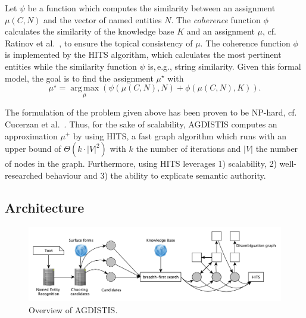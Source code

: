 Let $\psi$ be a function which computes the similarity between an assignment $\mu(C,N)$ and the vector of named entities $N$.
The \emph{coherence} function $\phi$ calculates the similarity of the knowledge base $K$ and an assignment $\mu$, cf. Ratinov et al.~\cite{rat:rot}, to ensure the topical consistency of $\mu$.
The coherence function $\phi$ is implemented by the  \ac{HITS} algorithm, which calculates the most pertinent entities while the similarity function $\psi$ is,\,e.g., string similarity.
Given this formal model, the goal is to find the assignment $\mu^\star$ with
\begin{equation*}
\mu^\star= \operatorname*{arg\,max}\limits_{\mu}\left(\psi(\mu(C,N), N) + \phi(\mu(C,N),K)\right).
\end{equation*}

The formulation of the problem given above has been proven to be NP-hard, cf. Cucerzan et al.~\cite{Cucerzan07}.
Thus, for the sake of scalability, AGDISTIS computes an approximation $\mu^{+}$ by using  \ac{HITS}, a fast graph algorithm which runs with an upper bound of $\Theta(k\cdot |V|^2)$ with $k$ the number of iterations and $|V|$ the number of nodes in the graph.
Furthermore, using  \ac{HITS} leverages 1) scalability, 2) well-researched behaviour and 3) the ability to explicate semantic authority. 

\subsection{Architecture}
\begin{figure}[h!tb]
\centering
\includegraphics[width=\linewidth]{part_02/unstructured_annotation/fig/overview.pdf}
\caption{Overview of AGDISTIS.}
\label{fig:overview_agdistis}
\end{figure}

